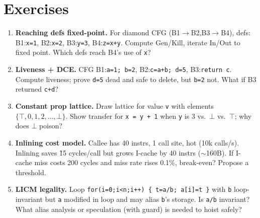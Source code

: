 \section{Exercises}
\label{sec:ch06-exercises}
\begin{enumerate}[label=E6.\arabic*, leftmargin=*, itemsep=0.8em]
\item \textbf{Reaching defs fixed-point.} For diamond CFG (B1$\to$B2,B3$\to$B4), defs: B1:\texttt{x=1}, B2:\texttt{x=2}, B3:\texttt{y=3}, B4:\texttt{z=x+y}. Compute Gen/Kill, iterate In/Out to fixed point. Which defs reach B4's use of \texttt{x}?
\item \textbf{Liveness + DCE.} CFG B1:\texttt{a=1; b=2}, B2:\texttt{c=a+b; d=5}, B3:\texttt{return c}. Compute liveness; prove \texttt{d=5} dead and safe to delete, but \texttt{b=2} not. What if B3 returned \texttt{c+d}?
\item \textbf{Constant prop lattice.} Draw lattice for value \texttt{v} with elements $\{\top, 0,1,2,\dots,\bot\}$. Show transfer for \texttt{x = y + 1} when \texttt{y} is $3$ vs.\ $\bot$ vs.\ $\top$; why does $\bot$ poison?
\item \textbf{Inlining cost model.} Callee has 40 instrs, 1 call site, hot (10k calls/s). Inlining saves \~15 cycles/call but grows I-cache by 40 instrs ($\sim$160B). If I-cache miss costs 200 cycles and miss rate rises 0.1\%, break-even? Propose a threshold.
\item \textbf{LICM legality.} Loop \texttt{for(i=0;i<n;i++) \{ t=a/b; a[i]=t \}} with \texttt{b} loop-invariant but \texttt{a} modified in loop and may alias \texttt{b}'s storage. Is \texttt{a/b} invariant? What alias analysis or speculation (with guard) is needed to hoist safely?
\end{enumerate}


